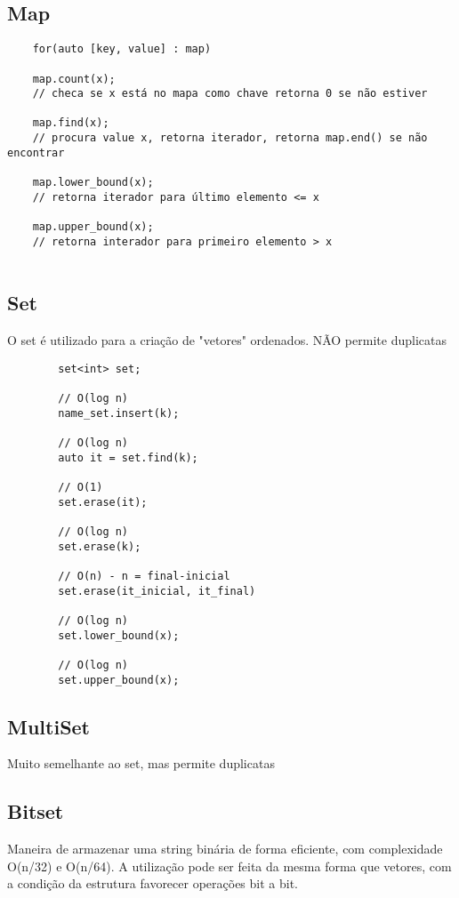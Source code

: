 \subsection{Map}
\begin{verbatim}
    for(auto [key, value] : map)

    map.count(x);
    // checa se x está no mapa como chave retorna 0 se não estiver

    map.find(x);
    // procura value x, retorna iterador, retorna map.end() se não encontrar

    map.lower_bound(x);
    // retorna iterador para último elemento <= x

    map.upper_bound(x);
    // retorna interador para primeiro elemento > x
    

\end{verbatim}

\subsection{Set}    
    O set é utilizado para a criação de "vetores" ordenados. NÃO permite duplicatas
    \begin{verbatim}
        set<int> set; 

        // O(log n)
        name_set.insert(k);

        // O(log n)
        auto it = set.find(k);

        // O(1)
        set.erase(it);

        // O(log n)
        set.erase(k);

        // O(n) - n = final-inicial
        set.erase(it_inicial, it_final)
        
        // O(log n)
        set.lower_bound(x);

        // O(log n)
        set.upper_bound(x);
    \end{verbatim}

\subsection{MultiSet} 

Muito semelhante ao set, mas permite duplicatas

\subsection{Bitset}
    Maneira de armazenar uma string binária de forma eficiente, com complexidade O(n/32) e O(n/64). A utilização pode ser feita da mesma forma que vetores, com a condição da estrutura favorecer operações bit a bit.

